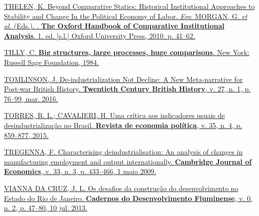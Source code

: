 \href{https://www.zotero.org/google-docs/?p3HTgZ}{THELEN, K. Beyond
Comparative Statics: Historical Institutional Approaches to Stability
and Change In the Political Economy of Labor. \emph{Em}: MORGAN, G.
\emph{et al.} (Eds.). . \textbf{The Oxford Handbook of Comparative
Institutional Analysis}. 1. ed. {[}s.l.{]} Oxford University Press,
2010. p. 41--62.}

\href{https://www.zotero.org/google-docs/?p3HTgZ}{TILLY, C. \textbf{Big
structures, large processes, huge comparisons}. New York: Russell Sage
Foundation, 1984.}

\href{https://www.zotero.org/google-docs/?p3HTgZ}{TOMLINSON, J.
De-industrialization Not Decline: A New Meta-narrative for Post-war
British History. \textbf{Twentieth Century British History}, v. 27, n.
1, p. 76--99, mar. 2016.}

\href{https://www.zotero.org/google-docs/?p3HTgZ}{TORRES, R. L.;
CAVALIERI, H. Uma crítica aos indicadores usuais de desindustrialização
no Brasil. \textbf{Revista de economia política}, v. 35, n. 4, p.
859--877, 2015.}

\href{https://www.zotero.org/google-docs/?p3HTgZ}{TREGENNA, F.
Characterising deindustrialisation: An analysis of changes in
manufacturing employment and output internationally. \textbf{Cambridge
Journal of Economics}, v. 33, n. 3, p. 433--466, 1 maio 2009.}

\href{https://www.zotero.org/google-docs/?p3HTgZ}{VIANNA DA CRUZ, J. L.
Os desafios da construção do desenvolvimento no Estado do Rio de
Janeiro. \textbf{Cadernos do Desenvolvimento Fluminense}, v. 0, n. 2, p.
47--80, 10 jul. 2013.}
